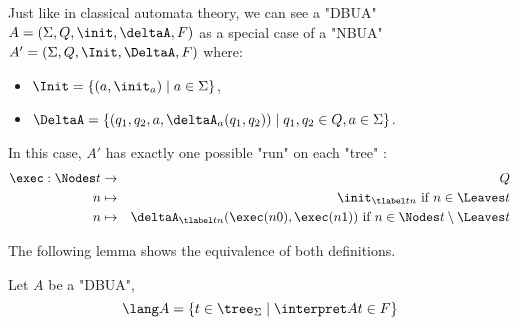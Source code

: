 \documentclass[a4paper,UKenglish,cleveref, autoref, thm-restate]{lipics-v2021}
\begin{document}
\begin{remark}
    Just like in classical automata theory, we can see a "DBUA" $A = (\Sigma, Q, \init, \deltaA, F)$ as a special 
    case of a "NBUA" $A' = (\Sigma, Q, \Init, \DeltaA, F)$ where:
	\begin{itemize}
		\item $\Init = \setdef{(a, \init_a)}{a \in \Sigma}$,
		\item $\DeltaA = \setdef{(q_1, q_2, a, \deltaA_a(q_1, q_2))}{q_1, q_2 \in Q, a \in \Sigma}$.
	\end{itemize}

	In this case, $A'$ has exactly one possible "run" on each "tree" :
	\begin{eqnarray*}
		\exec : \Nodes t  &\to & Q \\
		n  &\mapsto& \init_{\tlabel t n} \text{ if } n \in \Leaves t \\
		n  &\mapsto& \deltaA_{\tlabel t n}(\exec (n0), \exec (n1)) \text{ if } n \in \Nodes t  \setminus \Leaves t
	\end{eqnarray*}
\end{remark}


The following lemma shows the equivalence of both definitions.

\begin{lemma}
	Let $A$ be a "DBUA",
	\[ \lang A = \setdef {t \in \tree_{\Sigma}} {\interpret A t \in F} \]
\end{lemma}
\end{document}
